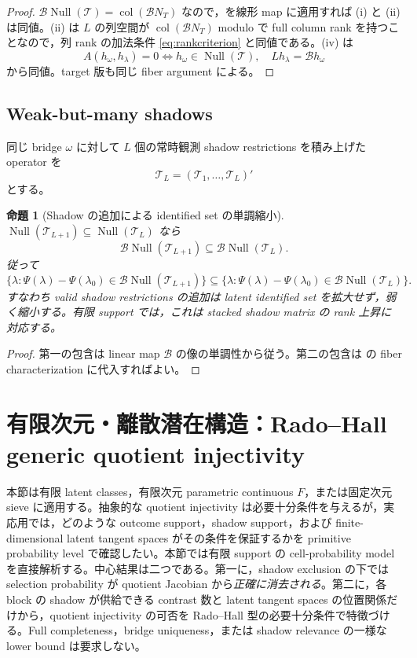 \documentclass[11pt,a4paper]{ltjsarticle}
\newtheorem{proposition}{命題}[section]
\theoremstyle{remark}
\newcommand{\Top}{\mathscr T}
\newcommand{\Bop}{\mathscr B}
\newcommand{\Null}{\operatorname{Null}}
\newcommand{\col}{\operatorname{col}}
\begin{document}
\begin{proof}
$\Bop\Null(\Top)=\col(\Bop N_T)$ なので，を線形 map に適用すれば (i) と (ii) は同値。(ii) は $L$ の列空間が $\col(\Bop N_T)$ modulo で full column rank を持つことなので，列 rank の加法条件 \eqref{eq:rankcriterion} と同値である。(iv) は
\[
A(h_\omega,h_\lambda)=0
\Longleftrightarrow
h_\omega\in\Null(\Top),\quad
Lh_\lambda=\Bop h_\omega
\]
から同値。target 版も同じ fiber argument による。
\end{proof}

\subsection{Weak-but-many shadows}
同じ bridge $\omega$ に対して $L$ 個の常時観測 shadow restrictions を積み上げた operator を
\[
\Top_L=(\Top_1,\ldots,\Top_L)'
\]
とする。

\begin{proposition}[Shadow の追加による identified set の単調縮小]\label{prop:manyshadow}
$\Null(\Top_{L+1})\subseteq\Null(\Top_L)$ なら
\[
\Bop\Null(\Top_{L+1})\subseteq\Bop\Null(\Top_L).
\]
従って
\[
\{\lambda:\Psi(\lambda)-\Psi(\lambda_0)\in\Bop\Null(\Top_{L+1})\}
\subseteq
\{\lambda:\Psi(\lambda)-\Psi(\lambda_0)\in\Bop\Null(\Top_L)\}.
\]
すなわち valid shadow restrictions の追加は latent identified set を拡大せず，弱く縮小する。有限 support では，これは stacked shadow matrix の rank 上昇に対応する。
\end{proposition}

\begin{proof}
第一の包含は linear map $\Bop$ の像の単調性から従う。第二の包含は の fiber characterization に代入すればよい。
\end{proof}

\section{有限次元・離散潜在構造：Rado--Hall generic quotient injectivity}\label{sec:generic}

本節は有限 latent classes，有限次元 parametric continuous $F$，または固定次元 sieve に適用する。抽象的な quotient injectivity は必要十分条件を与えるが，実応用では，どのような outcome support，shadow support，および finite-dimensional latent tangent spaces がその条件を保証するかを primitive probability level で確認したい。本節では有限 support の cell-probability model を直接解析する。中心結果は二つである。第一に，shadow exclusion の下では selection probability が quotient Jacobian から\emph{正確に消去される}。第二に，各 block の shadow が供給できる contrast 数と latent tangent spaces の位置関係だけから，quotient injectivity の可否を Rado--Hall 型の必要十分条件で特徴づける。Full completeness，bridge uniqueness，または shadow relevance の一様な lower bound は要求しない。
\end{document}
